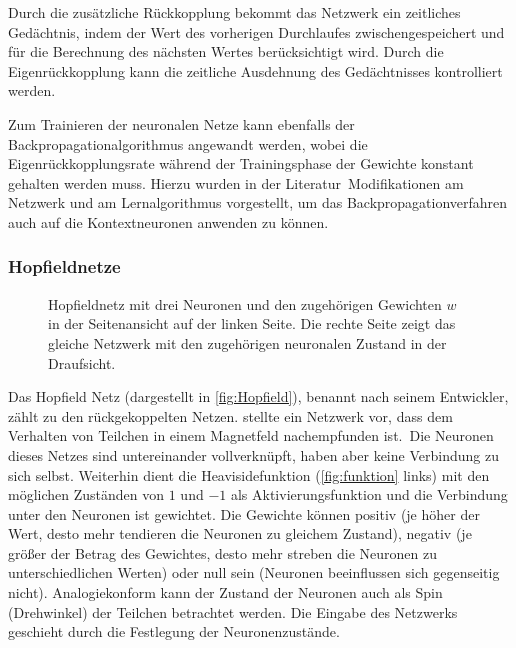 Durch die zusätzliche Rückkopplung bekommt das Netzwerk ein zeitliches Gedächtnis, indem der Wert des vorherigen Durchlaufes zwischengespeichert und für die Berechnung des nächsten Wertes berücksichtigt wird. Durch die Eigenrückkopplung kann die zeitliche Ausdehnung des Gedächtnisses kontrolliert werden. 

Zum Trainieren der neuronalen Netze kann ebenfalls der Backpropagationalgorithmus angewandt werden, wobei die Eigenrückkopplungsrate während der Trainingsphase der Gewichte konstant gehalten werden muss. Hierzu wurden in der Literatur\, Modifikationen am Netzwerk und am Lernalgorithmus vorgestellt, um das Backpropagationverfahren auch auf die Kontextneuronen anwenden zu können.


\subsubsection{Hopfieldnetze}%
\begin{figure}[!htb]
    \centering
        
    \caption[Darstellung eines Hopfieldnetzes]{Hopfieldnetz mit drei Neuronen und den zugehörigen Gewichten $w$ in der Seitenansicht auf der linken Seite. Die rechte Seite zeigt das gleiche Netzwerk mit den zugehörigen neuronalen Zustand in der Draufsicht.\,\protect\footnotemark{}}
    \label{fig:Hopfield}
\end{figure}
\addtocounter{footnote}{-1}     %
\addtocounter{Hfootnote}{-1}    %
\wrapfigfoot{}
Das Hopfield Netz (dargestellt in \autoref{fig:Hopfield}), benannt nach seinem Entwickler, zählt zu den rückgekoppelten Netzen. \citet{HOPFIELD1986} stellte ein Netzwerk vor, dass dem Verhalten von Teilchen in einem Magnetfeld nachempfunden ist.\, Die Neuronen dieses Netzes sind untereinander vollverknüpft, haben aber keine Verbindung zu sich selbst. Weiterhin dient die Heavisidefunktion (\autoref{fig:funktion} links) mit den möglichen Zuständen von $1$ und $-1$ als Aktivierungsfunktion und die Verbindung unter den Neuronen ist gewichtet. Die Gewichte können positiv (je höher der Wert, desto mehr tendieren die Neuronen zu gleichem Zustand), negativ (je größer der Betrag des Gewichtes, desto mehr streben die Neuronen zu unterschiedlichen Werten) oder null sein (Neuronen beeinflussen sich gegenseitig nicht). Analogiekonform kann der Zustand der Neuronen auch als Spin (Drehwinkel) der Teilchen betrachtet werden. Die Eingabe des Netzwerks geschieht durch die Festlegung der Neuronenzustände. 


